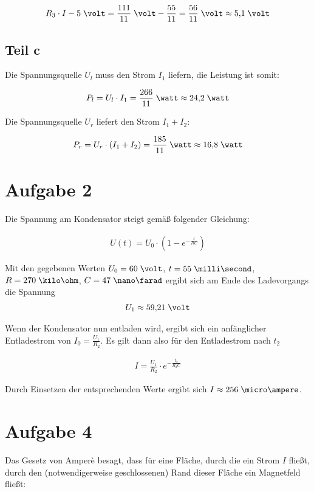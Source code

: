 \documentclass[a4paper,german,12pt,smallheadings]{scrartcl}
\begin{document}
\begin{align*}
  R_3 \cdot I - 5\;\volt = \frac{111}{11}\;\volt - \frac{55}{11} = \frac{56}{11}\;\volt \approx 5{,}1\;\volt
\end{align*}

\subsection*{Teil c}
Die Spannungsquelle $U_l$ muss den Strom $I_1$ liefern, die Leistung ist somit:

\begin{align*}
  P_l = U_l \cdot I_1 = \frac{266}{11} \;\watt \approx 24{,}2\;\watt
\end{align*}

Die Spannungsquelle $U_r$ liefert den Strom $I_1 + I_2$:

\begin{align*}
  P_r = U_r \cdot (I_1 + I_2) = \frac{185}{11} \;\watt \approx 16{,}8\;\watt
\end{align*}

\section*{Aufgabe 2}
Die Spannung am Kondensator steigt gemäß folgender Gleichung:

\begin{align*}
  U(t) = U_0 \cdot (1 - e^{-\frac{t}{RC}})
\end{align*}

Mit den gegebenen Werten $U_0 = 60\;\volt$, $t = 55\;\milli\second$, $R = 270\;\kilo\ohm$, $C = 47\;\nano\farad$ ergibt sich am Ende des Ladevorgangs die Spannung
\begin{align*}
  U_1 \approx 59{,}21 \;\volt
\end{align*}

Wenn der Kondensator nun entladen wird, ergibt sich ein anfänglicher
Entladestrom von $I_0 = \frac{U_1}{R_2}$. Es gilt dann also für den
Entladestrom nach $t_2$

\begin{align*}
  I = \frac{U_1}{R_2} \cdot e^{-\frac{t_2}{R_2C}}
\end{align*}

Durch Einsetzen der entsprechenden Werte ergibt sich $I \approx 256\;\micro\ampere$.

\section*{Aufgabe 4}
Das Gesetz von Amperè besagt, dass für eine Fläche, durch die ein Strom $I$
fließt, durch den (notwendigerweise geschlossenen) Rand dieser Fläche ein
Magnetfeld fließt:
\end{document}
